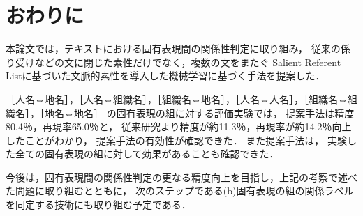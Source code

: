 \documentclass[japanese]{jnlp_1.4}
\begin{document}
\section{おわりに}
\label{sec:owarini}

本論文では，テキストにおける固有表現間の関係性判定に取り組み，
従来の係り受けなどの文に閉じた素性だけでなく，複数の文をまたぐ
Salient Referent Listに基づいた文脈的素性を導入した機械学習に基づく手法を提案した．


［人名⇔地名］，［人名⇔組織名］，［組織名⇔地名］，［人名⇔人名］，［組織名⇔組織名］，［地名⇔地名］
の固有表現の組に対する評価実験では，
提案手法は精度80.4％，再現率65.0％と，
従来研究より精度が約11.3％，再現率が約14.2％向上したことがわかり，
提案手法の有効性が確認できた．
また提案手法は，
実験した全ての固有表現の組に対して効果があることも確認できた．

今後は，固有表現間の関係性判定の更なる精度向上を目指し，上記の考察で述べた問題に取り組むとともに，
次のステップである(b)固有表現の組の関係ラベルを同定する技術にも取り組む予定である．
\end{document}

